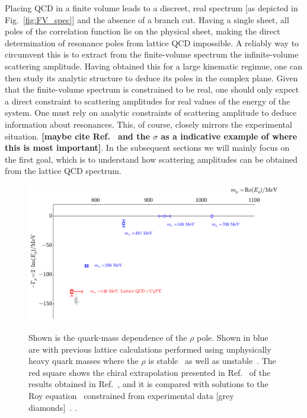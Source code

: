 \documentclass{iopart}
\newcommand{\raul}[0]{\bf \color{blue} }
\theoremstyle{definition}
\begin{document}
{ 
Placing QCD in a finite volume leads to a discreet, real spectrum [as depicted in Fig.~\ref{fig:FV_spec}] and the absence of a branch cut. Having a single sheet, all poles of the correlation function lie on the physical sheet, making the direct determination of resonance poles from lattice QCD impossible. A reliably way to circumvent this is to extract from the finite-volume spectrum the infinite-volume scattering amplitude. Having obtained this for a large kinematic regimue, one can then study its analytic structure to deduce its poles in the complex plane. Given that the finite-volume spectrum is constrained to be real, one should only expect a direct constraint to scattering amplitudes for real values of the energy of the system. One must rely on analytic constraints of scattering amplitude to deduce information about resonances. This, of course, closely mirrors the experimental situation. {\raul [maybe cite Ref.~\cite{Pelaez:2015qba} and the $\sigma$ as a indicative example of where this is most important]}. In the subsequent sections we will mainly focus on the first goal, which is to understand how scattering amplitudes can be obtained from the lattice QCD spectrum. 





\begin{figure}[t]
\centering
{\includegraphics[scale=0.3]{rho_mpi_0}}
\caption{ Shown is the quark-mass dependence of the $\rho$ pole. Shown in blue are with previous lattice calculations performed using unphysically heavy quark masses where the $\rho$ is stable~\cite{Lin:2008pr} as well as unstable~\cite{Dudek:2012xn, Wilson:2015dqa}. The red square shows the chiral extrapolation presented in Ref.~\cite{Bolton:2015psa} of the results obtained in Ref.~\cite{Wilson:2015dqa}, and it is compared with solutions to the Roy equation~\cite{Roy:1971tc} constrained from experimental data [grey diamonds]~\cite{Masjuan:2014psa, Ananthanarayan:2000ht, Colangelo:2001df, Zhou:2004ms, GarciaMartin:2011jx, Masjuan:2013jha}.
.}
\label{fig:rho_mpi_0} 
\end{figure}

}
\end{document}

